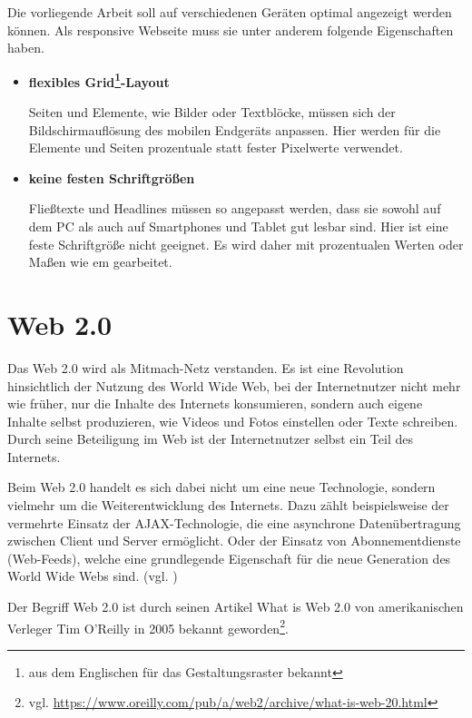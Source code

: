Die vorliegende Arbeit soll auf verschiedenen Geräten optimal angezeigt werden können. Als \glqq responsive\grqq{} Webseite muss sie unter anderem folgende Eigenschaften haben.

\begin{itemize}
\item \textbf{flexibles Grid\footnote{aus dem Englischen für das Gestaltungsraster bekannt}-Layout}\par
Seiten und Elemente, wie Bilder oder Textblöcke, müssen sich der Bildschirmauflösung des mobilen Endgeräts anpassen. Hier werden für die Elemente und Seiten prozentuale statt fester Pixelwerte verwendet.
\item \textbf{keine festen Schriftgrößen}\par
Fließtexte und Headlines müssen so angepasst werden, dass sie sowohl auf dem PC als auch auf Smartphones und Tablet gut lesbar sind. Hier ist eine feste Schriftgröße nicht geeignet. Es wird daher mit prozentualen Werten oder Maßen wie em gearbeitet.
\end{itemize}

\section{Web 2.0}
\label{sec:web2.0}
Das Web 2.0 wird als \glqq Mitmach-Netz\grqq{} verstanden. Es ist eine Revolution hinsichtlich der Nutzung des World Wide Web, bei der Internetnutzer nicht mehr wie früher, nur die Inhalte des Internets konsumieren, sondern auch eigene Inhalte selbst produzieren, wie Videos und Fotos einstellen oder Texte schreiben. Durch seine Beteiligung im Web ist der Internetnutzer selbst ein Teil des Internets.\bigskip 

Beim Web 2.0 handelt es sich dabei nicht um eine neue Technologie, sondern vielmehr um die Weiterentwicklung des Internets. Dazu zählt beispielsweise der vermehrte Einsatz der AJAX-Technologie, die eine asynchrone Datenübertragung zwischen Client und Server ermöglicht. Oder der Einsatz von Abonnementdienste (Web-Feeds), welche eine grundlegende Eigenschaft für die neue Generation des World Wide Webs sind. (vgl. \cite{o.V.2008})\bigskip

Der Begriff Web 2.0 ist durch seinen Artikel \glqq What is Web 2.0\grqq{} von amerikanischen Verleger Tim O’Reilly in 2005 bekannt geworden\footnote{vgl. \url{https://www.oreilly.com/pub/a/web2/archive/what-is-web-20.html}}.

